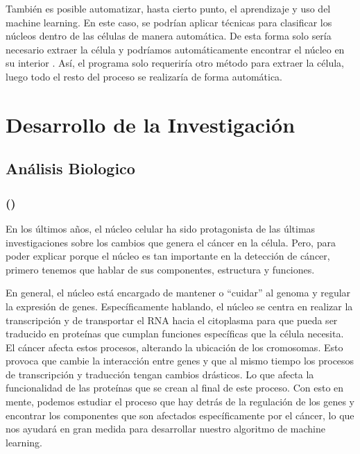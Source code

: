 \documentclass[12pt, letterpaper]{article}
\begin{document}
También es posible automatizar, hasta cierto punto, el aprendizaje y uso del machine learning. En este caso, se podrían aplicar técnicas para clasificar los núcleos dentro de las células de manera automática. De esta forma solo sería necesario extraer la célula y podríamos automáticamente encontrar el núcleo en su interior \autocite{sirinukunwattanaLocalitySensitiveDeep2016}. Así, el programa solo requeriría otro método para extraer la célula, luego todo el resto del proceso se realizaría de forma automática.

\newpage

\section{Desarrollo de la Investigación}


\subsection{Análisis Biologico}


\subsubsection{\texorpdfstring{ (\citeauthor{rynearsonNuclearStructureOrganization2011})}{}}
En los últimos años, el núcleo celular ha sido protagonista de las últimas investigaciones sobre los cambios que genera el cáncer en la célula. Pero, para poder explicar porque el núcleo es tan importante en la detección de cáncer, primero tenemos que hablar de sus componentes, estructura y funciones. 

En general, el núcleo está encargado de mantener o \enquote{cuidar} al genoma y regular la expresión de genes. Específicamente hablando, el núcleo se centra en realizar la transcripción y de transportar el RNA hacia el citoplasma para que pueda ser traducido en proteínas que cumplan funciones específicas que la célula necesita. El cáncer afecta estos procesos, alterando la ubicación de los cromosomas. Esto provoca que cambie la interacción entre genes y que al mismo tiempo los procesos de transcripción y traducción tengan cambios drásticos. Lo que afecta la funcionalidad de las proteínas que se crean al final de este proceso. Con esto en mente, podemos estudiar el proceso que hay detrás de la regulación de los genes y encontrar los componentes que son afectados específicamente por el cáncer, lo que nos ayudará en gran medida para desarrollar nuestro algoritmo de machine learning.
\end{document}
